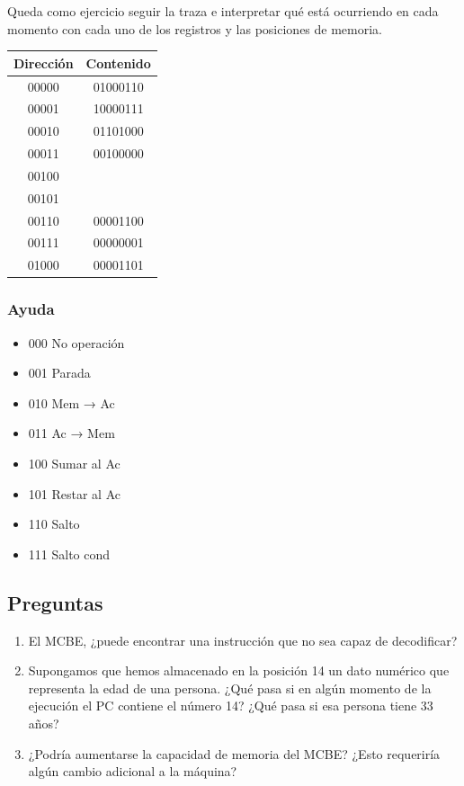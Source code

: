 \documentclass[spanish,a4paper,]{article}
\providecommand{\tightlist}{%
  \setlength{\itemsep}{0pt}\setlength{\parskip}{0pt}}
\begin{document}
Queda como ejercicio seguir la traza e interpretar qué está ocurriendo
en cada momento con cada uno de los registros y las posiciones de
memoria.

\begin{longtable}[]{@{}cc@{}}
\toprule
Dirección & Contenido\tabularnewline
\midrule
\endhead
00000 & 01000110\tabularnewline
00001 & 10000111\tabularnewline
00010 & 01101000\tabularnewline
00011 & 00100000\tabularnewline
00100 &\tabularnewline
00101 &\tabularnewline
00110 & 00001100\tabularnewline
00111 & 00000001\tabularnewline
01000 & 00001101\tabularnewline
\bottomrule
\end{longtable}

\hypertarget{ayuda}{%
\subsubsection{Ayuda}\label{ayuda}}

\begin{itemize}
\tightlist
\item
  000 No operación
\item
  001 Parada
\item
  010 Mem → Ac
\item
  011 Ac → Mem
\item
  100 Sumar al Ac
\item
  101 Restar al Ac
\item
  110 Salto
\item
  111 Salto cond
\end{itemize}

\hypertarget{preguntas}{%
\subsection{Preguntas}\label{preguntas}}

\begin{enumerate}
\def\labelenumi{\arabic{enumi}.}
\tightlist
\item
  El MCBE, ¿puede encontrar una instrucción que no sea capaz de
  decodificar?
\item
  Supongamos que hemos almacenado en la posición 14 un dato numérico que
  representa la edad de una persona. ¿Qué pasa si en algún momento de la
  ejecución el PC contiene el número 14? ¿Qué pasa si esa persona tiene
  33 años?
\item
  ¿Podría aumentarse la capacidad de memoria del MCBE? ¿Esto requeriría
  algún cambio adicional a la máquina?
\end{enumerate}
\end{document}
